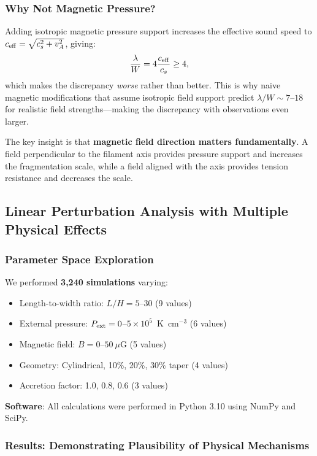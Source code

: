 \documentclass[11pt,a4paper]{article}
\begin{document}
\subsubsection{Why Not Magnetic Pressure?}

Adding isotropic magnetic pressure support increases the effective sound speed to $c_{\rm eff} = \sqrt{c_s^2 + v_A^2}$, giving:
\begin{equation}
\frac{\lambda}{W} = 4 \frac{c_{\rm eff}}{c_s} \geq 4,
\end{equation}
which makes the discrepancy \emph{worse} rather than better. This is why naive magnetic modifications that assume isotropic field support predict $\lambda/W \sim 7$--$18$ for realistic field strengths—making the discrepancy with observations even larger.

The key insight is that \textbf{magnetic field direction matters fundamentally}. A field perpendicular to the filament axis provides pressure support and increases the fragmentation scale, while a field aligned with the axis provides tension resistance and decreases the scale.

\subsection{Linear Perturbation Analysis with Multiple Physical Effects}

\subsubsection{Parameter Space Exploration}

We performed \textbf{3,240 simulations} varying:
\begin{itemize}
    \item Length-to-width ratio: $L/H = 5$--$30$ (9 values)
    \item External pressure: $P_{\rm ext} = 0$--$5 \times 10^5$~K~cm$^{-3}$ (6 values)
    \item Magnetic field: $B = 0$--$50~\mu$G (5 values)
    \item Geometry: Cylindrical, 10\%, 20\%, 30\% taper (4 values)
    \item Accretion factor: 1.0, 0.8, 0.6 (3 values)
\end{itemize}

\textbf{Software}: All calculations were performed in Python 3.10 using NumPy and SciPy.

\subsubsection{Results: Demonstrating Plausibility of Physical Mechanisms}
\end{document}
